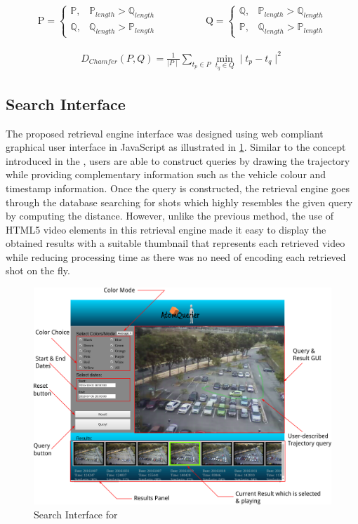 \begin{align}
\mathrm{P} =\begin{cases}
\mathbb{P}, & \mathbb{P}_{length} > \mathbb{Q}_{length} \\
\mathbb{Q}, & \mathbb{Q}_{length} > \mathbb{P}_{length}
\end{cases}   \hspace{2em}  &  \hspace{2em}
\mathrm{Q} =\begin{cases}
\mathbb{Q}, & \mathbb{P}_{length} > \mathbb{Q}_{length} \\
\mathbb{P}, & \mathbb{Q}_{length} > \mathbb{P}_{length}
\end{cases}
\end{align}


\begin{align}
\label{eq:chamferDistance}
D_{Chamfer} (P,Q) = \frac{1}{\mid P \mid} \sum_{t_p \in P} \min_{t_q \in Q}  \mid t_p - t_q \mid^{2}
\end{align}

\subsection{Search Interface}
The proposed retrieval engine interface was designed using web compliant graphical user interface in JavaScript as illustrated in \ref{fig:versionTwoInterface}.
Similar to the concept introduced in the \versionOneRet, users are able to construct queries by drawing the trajectory while providing complementary information such as the vehicle colour and timestamp information.
Once the query is constructed, the retrieval engine goes through the database searching for shots which highly resembles the given query by computing the distance.
However, unlike the previous method, the use of HTML5 video elements in this retrieval engine made it easy to display the obtained results with a suitable thumbnail that represents each retrieved video while reducing processing time as there was no need of encoding each retrieved shot on the fly.

\begin{figure}[!hbt]\centering
\includegraphics[width=.9\textwidth]{image/retrievalTwo/VISERinterface2.png}
\caption{Search Interface for \versionTwoRet}
\label{fig:versionTwoInterface}
\end{figure}

